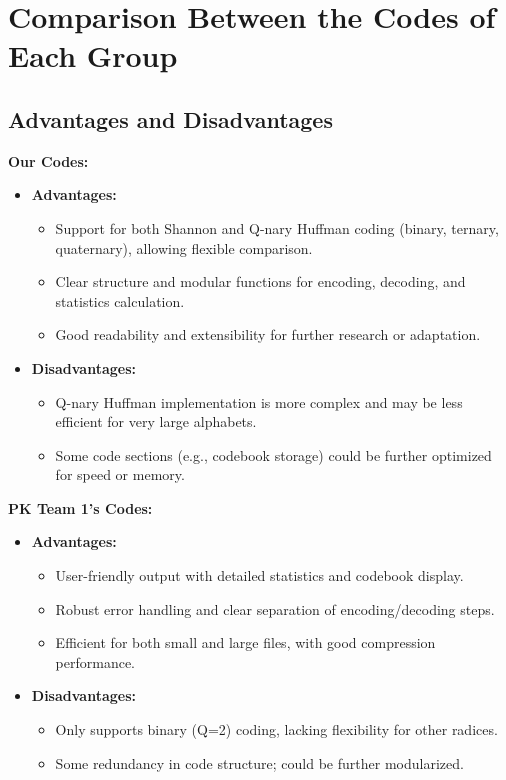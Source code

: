 \documentclass[12pt]{article}
\begin{document}
\section{Comparison Between the Codes of Each Group}
\subsection{Advantages and Disadvantages}
\textbf{Our Codes:}
\begin{itemize}
    \item \textbf{Advantages:}
        \begin{itemize}
            \item Support for both Shannon and Q-nary Huffman coding (binary, ternary, quaternary), allowing flexible comparison.
            \item Clear structure and modular functions for encoding, decoding, and statistics calculation.
            \item Good readability and extensibility for further research or adaptation.
        \end{itemize}
    \item \textbf{Disadvantages:}
        \begin{itemize}
            \item Q-nary Huffman implementation is more complex and may be less efficient for very large alphabets.
            \item Some code sections (e.g., codebook storage) could be further optimized for speed or memory.
        \end{itemize}
\end{itemize}

\textbf{PK Team 1's Codes:}
\begin{itemize}
    \item \textbf{Advantages:}
        \begin{itemize}
            \item User-friendly output with detailed statistics and codebook display.
            \item Robust error handling and clear separation of encoding/decoding steps.
            \item Efficient for both small and large files, with good compression performance.
        \end{itemize}
    \item \textbf{Disadvantages:}
        \begin{itemize}
            \item Only supports binary (Q=2) coding, lacking flexibility for other radices.
            \item Some redundancy in code structure; could be further modularized.
        \end{itemize}
\end{itemize}
\end{document}

